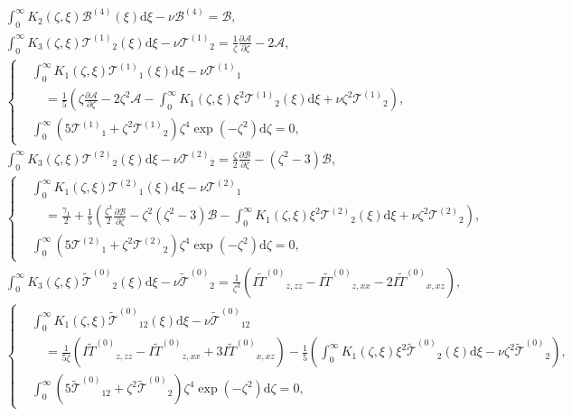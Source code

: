 \documentclass[a4paper,12pt]{article}
\newcommand{\dd}{\mathrm{d}}
\newcommand{\pder}[2][]{\frac{\partial#1}{\partial#2}}
\newcommand{\B}{\ensuremath{\mathcal{B}^{(4)}}}
\newcommand{\T}[1]{\ensuremath{\mathcal{T}^{(#1)}}}
\newcommand{\TT}{\ensuremath{\tilde{\mathcal{T}}^{(0)}}}
\newcommand{\IFF}[1]{\ensuremath{I\tilde{#1}^{(0)}}}
\begin{document}
\begin{gather}
    \int_0^\infty K_2(\zeta,\xi)\B(\xi)\dd\xi - \nu\B = \mathcal{B}, \\
    \int_0^\infty K_3(\zeta,\xi)\T{1}_2(\xi)\dd\xi - \nu\T{1}_2
        = \frac1\zeta\pder[\mathcal{A}]{\zeta} - 2\mathcal{A}, \\
    \left\{\begin{aligned}
    &\int_0^\infty K_1(\zeta,\xi)\T{1}_1(\xi)\dd\xi - \nu\T{1}_1 \\
        &\quad = \frac15\left( \zeta\pder[\mathcal{A}]{\zeta} - 2\zeta^2\mathcal{A}
        - \int_0^\infty K_1(\zeta,\xi)\xi^2\T{1}_2(\xi)\dd\xi
        + \nu\zeta^2\T{1}_2 \right), \\
    &\int_0^\infty \left( 5\T{1}_1 + \zeta^2\T{1}_2 \right) \zeta^4 \exp(-\zeta^2)\dd\zeta = 0,
    \end{aligned}\right.\\
    \int_0^\infty K_3(\zeta,\xi)\T{2}_2(\xi)\dd\xi - \nu\T{2}_2
        = \frac\zeta2\pder[\mathcal{B}]{\zeta} - \left(\zeta^2-3\right)\mathcal{B}, \\
    \left\{\begin{aligned}
    &\int_0^\infty K_1(\zeta,\xi)\T{2}_1(\xi)\dd\xi - \nu\T{2}_1 \\
        &\quad = \frac{\gamma_1}2 + \frac15\left( \frac{\zeta^3}2\pder[\mathcal{B}]{\zeta}
        - \zeta^2\left(\zeta^2-3\right)\mathcal{B}
        - \int_0^\infty K_1(\zeta,\xi)\xi^2\T{2}_2(\xi)\dd\xi
        + \nu\zeta^2\T{2}_2 \right), \\
    &\int_0^\infty \left( 5\T{2}_1 + \zeta^2\T{2}_2 \right) \zeta^4 \exp(-\zeta^2)\dd\zeta = 0,
    \end{aligned}\right.\\
    \int_0^\infty K_3(\zeta,\xi)\TT_2(\xi)\dd\xi - \nu\TT_2
        = \frac1{\zeta^3}\left(\IFF{T}_{z,zz} - \IFF{T}_{z,xx} - 2\IFF{T}_{x,xz}\right), \\
    \left\{\begin{aligned}
    &\int_0^\infty K_1(\zeta,\xi)\TT_{12}(\xi)\dd\xi - \nu\TT_{12} \\
        &\quad = \frac1{5\zeta}\left(\IFF{T}_{z,zz} - \IFF{T}_{z,xx} + 3\IFF{T}_{x,xz}\right)
        - \frac15\left(\int_0^\infty K_1(\zeta,\xi)\xi^2\TT_2(\xi)\dd\xi
        - \nu\zeta^2\TT_2 \right), \\
    &\int_0^\infty \left( 5\TT_{12} + \zeta^2\TT_2 \right) \zeta^4 \exp(-\zeta^2)\dd\zeta = 0,
    \end{aligned}\right.\\

\end{gather}
\end{document}
